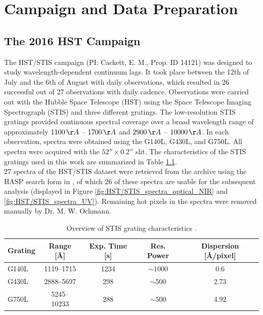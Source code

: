 \chapter{Campaign and Data Preparation}
\label{campaign_and_analysis}


\section{The 2016 HST Campaign}
\label{Campaign_Cackett}

The HST/STIS campaign (PI: Cackett, E. M., Prop. ID 14121) was designed to study wavelength-dependent continuum lags. It took place between the 12th of July and the 6th of August with daily observations, which resulted in 26 successful out of 27 observations with daily cadence. Observations were carried out with the Hubble Space Telescope (HST) using the Space Telescope Imaging Spectrograph (STIS) and three different gratings. The low-resolution STIS gratings provided continuous spectral coverage over a broad wavelength range of approximately  $1100\,\AA$ -- $1700\,\AA$ and $2900\,\AA$ -- $10000\,\AA$. In each observation, spectra were obtained using the G140L, G430L, and G750L. All spectra were acquired with the $52'' \times 0.2''$ slit. 
The characteristics of the STIS gratings used in this work are summarized in Table \ref{tab:stis_gratings}.\\
27 spectra of the HST/STIS dataset were retrieved from the \cite{HASP} archive using the HASP search form in \cite{MAST}, of which 26 of these spectra are usable for the subsequent analysis (displayed in Figure \ref{fig:HST/STIS_spectra_optical_NIR} and \ref{fig:HST/STIS_spectra_UV}). Remaining hot pixels in the spectra were removed manually by Dr. M. W. Ochmann.
\begin{table}[h!]
	\centering
	\small
	\caption[STIS grating]{Overview of STIS grating characteristics \parencite{stisgratings}.}
	\label{tab:stis_gratings}
	\begin{tabular}{lcccc}
		\hline
		\textbf{Grating} & \textbf{Range [\AA]} & \textbf{Exp. Time [s]} & \textbf{Res. Power} & \textbf{Dispersion [\AA/pixel]} \\
		\hline
		G140L  & 1119--1715  & 1234 & $\sim 1000$         & 0.6 \\
		G430L  & 2888--5697  & 298  & $\sim 500 $    & 2.73 \\
		G750L  & 5245--10233 & 288  & $\sim 500 $    & 4.92 \\
		\hline
	\end{tabular}
\end{table}
